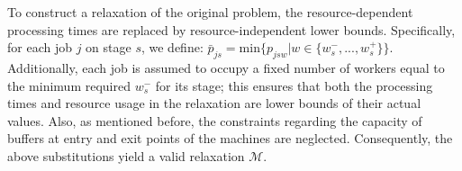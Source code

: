 \documentclass[a4paper,final]{article}
\begin{document}
To construct a relaxation of the original problem, the resource-dependent processing times are replaced by resource-independent lower bounds. Specifically, for each job $j$ on stage $s$, we define: $\bar{p}_{js} = \text{min}\{p_{jsw}|w\in \{w^{-}_{s}, ..., w^{+}_{s}\}\}$. Additionally, each job is assumed to occupy a fixed number of workers equal to the minimum required $w^{-}_{s}$ for its stage; this ensures that both the processing times and resource usage in the relaxation are lower bounds of their actual values. Also, as mentioned before, the constraints regarding the capacity of buffers at entry and exit points of the machines are neglected. Consequently, the above substitutions yield a valid relaxation $\mathcal{M}$.%
        
\end{document}
